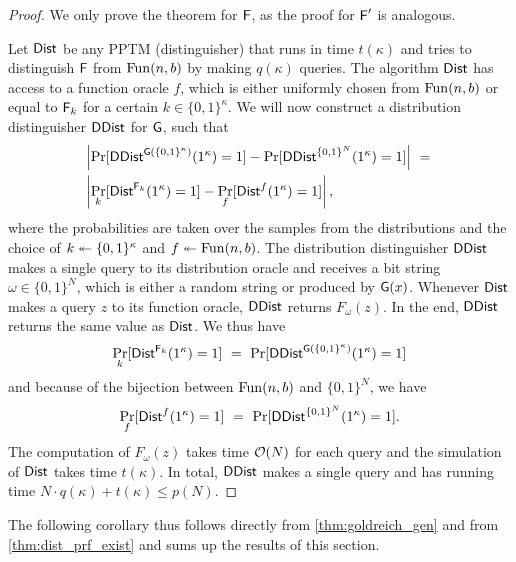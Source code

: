\begin{proof}
  We only prove the theorem for $\operatorname{\mathsf{F}}$, as the proof for $\operatorname{\mathsf{F}}'$ is analogous.

  Let $\operatorname{\mathsf{Dist}}$ be any \ac{PPTM} (distinguisher) that runs in time
  $t(\kappa)$ and tries to distinguish $\operatorname{\mathsf{F}}$ from
  $\operatorname{Fun}(n,b)$ by making $q(\kappa)$ queries. The algorithm $\operatorname{\mathsf{Dist}}$ has
  access to a function oracle $f$, which is either uniformly chosen from
  $\operatorname{Fun}(n,b)$ or equal to $\operatorname{\mathsf{F}}_{k}$ for a certain $k\in
  \{0,1\}^{\kappa}$.  We will now construct a distribution distinguisher $\operatorname{\mathsf{DDist}}$ for
  $\mathsf{G}$, such that
  \begin{align*}
    &\left|\Pr[\DDist^{\algo{G}(\{0,1\}^{\kappa})}(1^{\kappa})=1]-\Pr[\DDist^{\{0,1\}^{N}}(1^{\kappa})=1]\right|\ = \ \\
    &\left|\Pr_{k}[\Dist^{\algf_{k}}(1^{\kappa})=1]-\Pr_{f}
      [\Dist^{f}(1^{\kappa})=1]\right|,
  \end{align*}
where the probabilities are taken over the samples from the
distributions and the choice of $k\twoheadleftarrow \{0,1\}^{\kappa}$ and $f\twoheadleftarrow
\operatorname{Fun}(n,b)$. 
  The distribution distinguisher $\operatorname{\mathsf{DDist}}$ makes a single query to its distribution
  oracle and receives a bit string $\omega\in \{0,1\}^{N}$,
  which is either a random string or produced by $\mathsf{G}(x)$.
  Whenever $\operatorname{\mathsf{Dist}}$ makes a query $z$ to its function
  oracle, $\operatorname{\mathsf{DDist}}$ returns $F_{\omega}(z)$. In the end, $\operatorname{\mathsf{DDist}}$ returns
  the same value as $\operatorname{\mathsf{Dist}}$. We thus have
  \begin{align*}
    \Pr_{k}[\Dist^{\algf_{k}}(1^{\kappa})=1]\ = \ \Pr[\DDist^{\algo{G}(\{0,1\}^{\kappa})}(1^{\kappa})=1]
  \end{align*}
  and because of the bijection between $\operatorname{Fun}(n,b)$ and
  $\{0,1\}^{N}$, we have
  \begin{align*}
    \Pr_{f}[\Dist^{f}(1^{\kappa})=1]\ = \ \Pr[\DDist^{\{0,1\}^{N}}(1^{\kappa})=1].
  \end{align*}
  The computation of $F_{\omega}(z)$ takes time $\mathcal{O}(N)$ for each
  query and the  simulation of $\operatorname{\mathsf{Dist}}$ takes time $t(\kappa)$. In total,
  $\operatorname{\mathsf{DDist}}$ makes a single query and has running time $N\cdot
  q(\kappa)+t(\kappa) \leq p(N)$.
\end{proof}

The following corollary thus follows directly from  \autoref{thm:goldreich_gen} 
 and from \autoref{thm:dist_prf_exist} and
sums up the results of this section.

